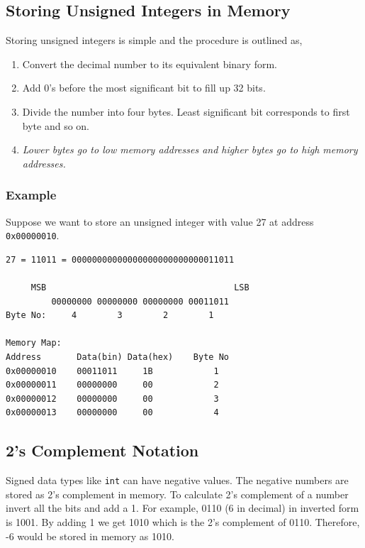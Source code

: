 \documentclass[12pt,a4paper]{article}
\begin{document}
\subsection{Storing Unsigned Integers in Memory}
Storing unsigned integers is simple and the procedure is outlined as,
\begin{enumerate}
\item Convert the decimal number to its equivalent binary form.
\item Add 0's before the most significant bit to fill up 32 bits\footnotemark.
\item Divide the number into four bytes. Least significant bit corresponds to first byte and so on.
\item \emph{Lower bytes go to low memory addresses and higher bytes go to high memory addresses.}
\end{enumerate}

\subsubsection{Example}
Suppose we want to store an unsigned integer with value 27 at address \verb|0x00000010|.

\begin{verbatim}
27 = 11011 = 00000000000000000000000000011011

     MSB                                     LSB
         00000000 00000000 00000000 00011011
Byte No:     4        3        2        1

Memory Map:
Address       Data(bin) Data(hex)    Byte No
0x00000010    00011011     1B            1
0x00000011    00000000     00            2
0x00000012    00000000     00            3
0x00000013    00000000     00            4
\end{verbatim}


\subsection{2's Complement Notation}
Signed data types like \verb|int| can have negative values. The negative numbers are stored as 2's complement in memory. To calculate 2's complement of a number invert all the bits and add a 1. For example, 0110 (6 in decimal) in inverted form is 1001. By adding 1 we get 1010 which is the 2's complement of 0110. Therefore, -6 would be stored in memory as 1010.
\end{document}
